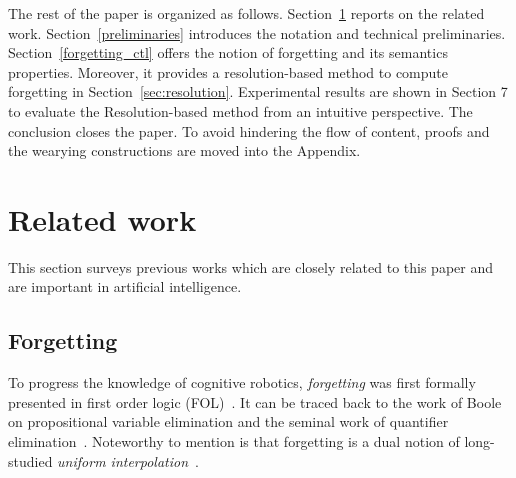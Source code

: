 \documentclass[twoside,11pt]{article}
\begin{document}
The rest of the paper is organized as follows.
Section~\ref{related_work} reports on the related work.
Section~\ref{preliminaries} introduces the notation and technical preliminaries.
Section~\ref{forgetting_ctl} offers the notion of forgetting and its semantics properties. Moreover, it provides a resolution-based method to compute forgetting in Section~\ref{sec:resolution}.
Experimental results are shown in Section 7 to evaluate the Resolution-based method from an intuitive perspective.
The conclusion closes the paper. To avoid hindering the flow of content, proofs and the wearying constructions are moved into the Appendix.





\section{Related work}
\label{related_work}

This section surveys previous works which are closely related to this paper and are important in artificial intelligence.


\subsection{Forgetting}
To progress the knowledge of cognitive robotics, \emph{forgetting} was first formally presented in first order logic (FOL)~\cite{lin1994forget}. It can  be traced back to the work of Boole on propositional
variable elimination and the seminal work of quantifier elimination~\cite{ackermann1935untersuchungen}.
Noteworthy to mention is that forgetting is a dual notion of long-studied {\em uniform interpolation}~\cite{visser1996uniform,konev2009forgetting}.
\end{document}

